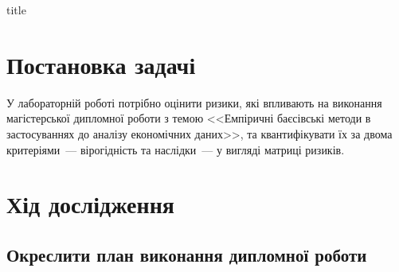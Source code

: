 \documentclass{mathreport}
\begin{document}




{title}

\tableofcontents

\newpage

\section*{Постановка задачі}

У лабораторній роботі потрібно оцінити ризики, які впливають на виконання магістерської дипломної роботи з темою <<Емпіричні баєсівські методи в застосуваннях до аналізу економічних даних>>, та квантифікувати їх за двома критеріями~--- вірогідність та наслідки~--- у вигляді матриці ризиків.

\section*{Хід дослідження}

\subsection{Окреслити план виконання дипломної роботи}
\end{document}

